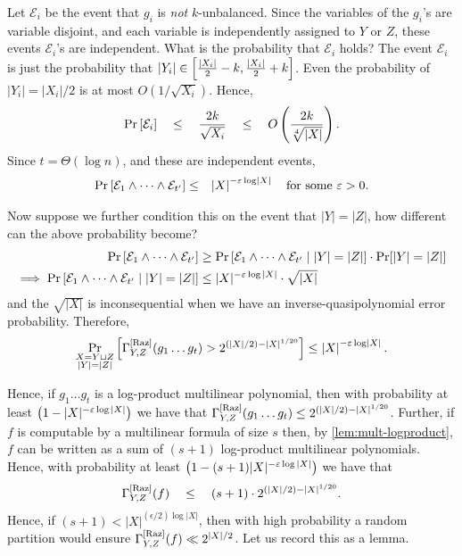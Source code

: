 Let $\mathcal{E}_i$ be the event that $g_i$ is \emph{not} $k$-unbalanced.
Since the variables of the $g_i$'s are variable disjoint, and each variable is independently assigned to $Y$ or $Z$, these events $\mathcal{E}_i$'s are independent. What is the probability that $\mathcal{E}_i$ holds? 
The event $\mathcal{E}_i$ is just the probability that  $|Y_i| \in \left[\frac{|X_i|}{2} -k , \frac{|X_i|}{2} +k\right]$. Even the probability of $|Y_i| = |X_i|/2$ is at most $O(1/\sqrt{X_i})$. Hence,
\[
  \Pr\left[\mathcal{E}_i\right] \quad \leq \quad \frac{2k}{\sqrt{X_i}} \quad \leq \quad O\left(\frac{2k}{\sqrt[4]{|X|}}\right).
\]
Since $t = \Theta(\log n)$, and these are independent events, 
\begin{eqnarray*}
  \Pr\left[\mathcal{E}_1\wedge \dots \wedge \mathcal{E}_{t'}\right] & \leq & \left|X\right|^{-\varepsilon \log \left|X\right|} \quad\text{for some $\varepsilon > 0$}.
\end{eqnarray*}

Now suppose we further condition this on the event that $|Y| = |Z|$, how different can the above probability become?
\begin{align*}
  \Pr\left[\mathcal{E}_1\wedge \dots \wedge \mathcal{E}_{t'}\right] & \geq  \Pr\left[\mathcal{E}_1\wedge \dots \wedge \mathcal{E}_{t'} \mid |Y| = |Z|\right] \cdot \Pr[|Y| = |Z|]\\
  \implies \Pr\left[\mathcal{E}_1\wedge \dots \wedge \mathcal{E}_{t'} \mid |Y| = |Z|\right] & \leq |X|^{-\varepsilon \log |X|} \cdot \sqrt{|X|}
\end{align*}
and the $\sqrt{|X|}$ is inconsequential when we have an inverse-quasipolynomial error probability.
Therefore,
\[
 \Pr_{\substack{X = Y\sqcup Z\\|Y| = |Z|}}\left[\Gamma^{\mathrm{[Raz]}}_{Y,Z}(g_1\dots g_t) > 2^{(|X|/2) - |X|^{1/20}}\right]  \leq  \left|X\right|^{-\varepsilon \log \left|X\right|}.
\]

Hence, if $g_1\dots g_t$ is a log-product multilinear polynomial, 
then with probability at least $\left(1 - |X|^{-\varepsilon \log |X|}\right)$ 
we have that $\Gamma^{\mathrm{[Raz]}}_{Y,Z}(g_1\dots g_t) \leq 2^{(|X|/2) - |X|^{1/20}}$. 
Further, if $f$ is computable by a multilinear formula of size $s$ then, 
by \autoref{lem:mult-logproduct}, $f$ can be written as a sum of 
$(s+1)$ log-product multilinear polynomials. 
Hence, with probability 
at least $\left(1 - (s+1)|X|^{-\varepsilon \log |X|}\right)$ we have that
$$\Gamma^{\mathrm{[Raz]}}_{Y,Z}(f) \quad \leq \quad (s+1) \cdot 2^{(|X|/2) - |X|^{1/20}}. $$
Hence, if $(s+1) < |X|^{(\epsilon/2) \log |X|}$, then with high 
probability a random partition would ensure 
$\Gamma^{\mathrm{[Raz]}}_{Y,Z}(f) \ll 2^{|X|/2}$. 
Let us record this as a lemma.


